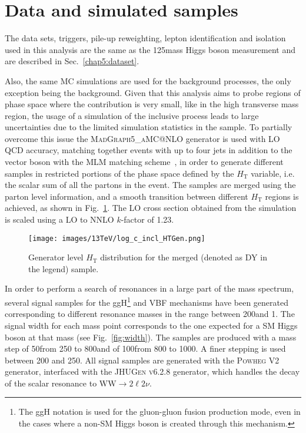 \section{Data and simulated samples}\label{chap6:datatsets}

The data sets, triggers, pile-up reweighting, lepton identification and isolation used in this analysis are the same as the 125\GeV mass Higgs boson measurement and are described in Sec.~\ref{chap5:dataset}.

Also, the same MC simulations are used for the background processes, the only exception being the \dyll background. Given that this analysis aims to probe regions of phase space where the \dyll contribution is very small, like in the high transverse mass region, the usage of a simulation of the inclusive \dyll process leads to large uncertainties due to the limited simulation statistics in the sample. To partially overcome this issue the \textsc{MadGraph5\_aMC@NLO} generator is used with LO QCD accuracy, matching together events with up to four jets in addition to the vector boson with the MLM matching scheme~\cite{Alwall:2007fs}, in order to generate different \dyll samples in restricted portions of the phase space defined by the $H_\mathrm{T}$ variable, i.e. the scalar sum of all the partons \pt in the event. 
The samples are merged using the parton level information, and a smooth transition between different $H_\mathrm{T}$ regions is achieved, as shown in Fig.~\ref{fig:DY_HT}. The \dyll LO cross section obtained from the simulation is scaled using a LO to NNLO $k$-factor of 1.23.

\begin{figure}[htbp]
\centering
\texttt{[image: images/13TeV/log\_c\_incl\_HTGen.png]}
\caption{
    Generator level $H_\mathrm{T}$ distribution for the merged \dyll (denoted as DY in the legend) sample.}
    \label{fig:DY_HT}
\end{figure}

In order to perform a search of resonances in a large part of the mass spectrum, several signal samples for the ggH\footnote{The ggH notation is used for the gluon-gluon fusion production mode, even in the cases where a non-SM Higgs boson is created through this mechanism.} and VBF mechanisms have been generated corresponding to different resonance masses in the range between 200\GeV and 1\TeV. The signal width for each mass point corresponds to the one expected for a SM Higgs boson at that mass (see Fig.~\ref{fig:width}). The samples are produced with a mass step of 50\GeV from 250 to 800\GeV and of 100\GeV from 800 to 1000\GeV. A finer stepping is used between 200 and 250\GeV. All signal samples are generated with the \textsc{Powheg V2} generator, interfaced with the \textsc{JHUGen v6.2.8} generator, which handles the decay of the scalar resonance to $\mathrm{W W}\to2\ell2\nu$.


